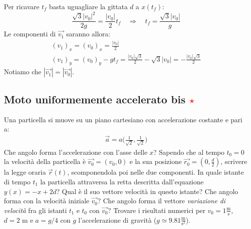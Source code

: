 \documentclass[12pt,a4paper]{book}
\newcommand{\rstar}{ \textcolor{red}{$\star$}}
\begin{document}
Per ricavare $t_f$ basta uguagliare la gittata $d$ a $x(t_f)$:
%
\begin{equation*}
\frac{\sqrt{3}|v_0|^2}{2g}=\frac{|v_0|}{2}t_f \quad \Rightarrow \quad t_f=\frac{\sqrt{3}|v_0|}{g}
\end{equation*}
%
Le componenti di $\vec{v_1}$ saranno allora:
%
\begin{gather*}
(v_1)_x=(v_0)_x= \frac{|v_0|}{2}\\
(v_1)_y=(v_0)_y - g t_f= \frac{|v_0|\sqrt{3}}{2} - \sqrt{3}|v_0| = - \frac{|v_0|\sqrt{3}}{2}
\end{gather*}
%
Notiamo che $|\vec{v_1}|=|\vec{v_0}|$. 

\subsection{Moto uniformemente accelerato bis \rstar}
Una particella si muove su un piano cartesiano con accelerazione costante e pari a:
%
\begin{gather*}
\vec{a}=a\big(\frac{1}{\sqrt{2}},\frac{1}{\sqrt{2}}\big)
\end{gather*}
%
Che angolo forma l'accelerazione con l'asse delle $x$? Sapendo che al tempo $t_0=0$ la velocità della particella è $\vec{v_0}=(v_0,0)$ e la sua posizione $\vec{r_0}=(0,\frac{d}{2})$, scrivere la legge oraria $\vec{r}(t)$, scomponendola poi nelle due componenti. In quale istante di tempo $t_1$ la particella attraversa la retta descritta dall'equazione $y(x)=-x+2d$? Qual è il suo vettore velocità in questo istante? Che angolo forma con la velocità iniziale $\vec{v_0}$? Che angolo forma il vettore \textit{variazione di velocità} fra gli istanti $t_1$ e $t_0$ con $\vec{v_0}$? Trovare i risultati numerici per $v_0=1 \frac{\text{m}}{\text{s}}$, $d=2$ m e $a=g/4$ con $g$ l'accelerazione di gravità ($g\simeq9.81 \frac{\text{m}}{\text{s}^2}$).
\end{document}
